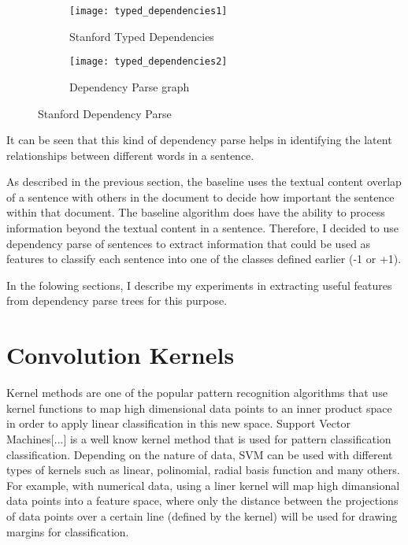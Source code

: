 \begin{figure}[h]
\begin{subfigure}{0.5\textwidth}
\texttt{[image: typed\_dependencies1]} 
\caption{Stanford Typed Dependencies}
\label{fig:typed-dep}
\end{subfigure}
\begin{subfigure}{0.5\textwidth}
\texttt{[image: typed\_dependencies2]}
\caption{Dependency Parse graph}
\label{fig:dep-parse}
\end{subfigure}
 
\caption{Stanford Dependency Parse}
\label{fig:stanford-dep-parse}
\end{figure}

It can be seen that this kind of dependency parse helps in identifying the latent relationships between different words in a sentence.

As described in the previous section, the baseline uses the textual content overlap of a sentence with others in the document to decide how important the sentence within that document.
The baseline algorithm does have the ability to process information beyond the textual content in a sentence.
Therefore, I decided to use dependency parse of sentences to extract information that could be used as features to classify each sentence into one of the classes defined earlier (-1 or +1).

In the folowing sections, I describe my experiments in extracting useful features from dependency parse trees for this purpose.

\section{Convolution Kernels}
Kernel methods are one of the popular pattern recognition algorithms that use kernel functions to map high dimensional data points to an inner product space in order to apply linear classification in this new space.
Support Vector Machines[...] is a well know kernel method that is used for pattern classification classification.
Depending on the nature of data, SVM can be used with different types of kernels such as linear, polinomial, radial basis function and many others.
For example, with numerical data, using a liner kernel will map high dimansional data points into a feature space, where only the distance between the projections of data points over a certain line (defined by the kernel) will be used for drawing margins for classification.

